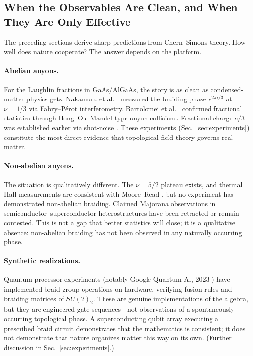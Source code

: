 \subsection{When the Observables Are Clean, and When They Are Only Effective}
\label{subsec:qhe-caveats}

The preceding sections derive sharp predictions from Chern--Simons theory. How well does nature cooperate? The answer depends on the platform.

\paragraph{Abelian anyons.}
For the Laughlin fractions in GaAs/AlGaAs, the story is as clean as condensed-matter physics gets. Nakamura et al.\ \cite{Nakamura2020AnyonicBraiding} measured the braiding phase $e^{2\pi i/3}$ at $\nu = 1/3$ via Fabry--P\'{e}rot interferometry. Bartolomei et al.\ \cite{Bartolomei2020AnyonCollisions} confirmed fractional statistics through Hong--Ou--Mandel-type anyon collisions. Fractional charge $e/3$ was established earlier via shot-noise \cite{Saminadayar1997FractionalCharge,dePicciotto1997FractionalCharge}. These experiments (Sec.~\ref{sec:experiments}) constitute the most direct evidence that topological field theory governs real matter.

\paragraph{Non-abelian anyons.}
The situation is qualitatively different. The $\nu = 5/2$ plateau exists, and thermal Hall measurements are consistent with Moore--Read \cite{NayakSimonSternFreedmanDasSarma2008NonabelianAnyons}, but no experiment has demonstrated non-abelian braiding. Claimed Majorana observations in semiconductor--superconductor heterostructures have been retracted or remain contested. This is not a gap that better statistics will close; it is a qualitative absence: non-abelian braiding has not been observed in any naturally occurring phase.

\paragraph{Synthetic realizations.}
Quantum processor experiments (notably Google Quantum AI, 2023 \cite{Andersen2023NonAbelianBraiding}) have implemented braid-group operations on hardware, verifying fusion rules and braiding matrices of $SU(2)_2$. These are genuine implementations of the algebra, but they are engineered gate sequences---not observations of a spontaneously occurring topological phase. A superconducting qubit array executing a prescribed braid circuit demonstrates that the mathematics is consistent; it does not demonstrate that nature organizes matter this way on its own. (Further discussion in Sec.~\ref{sec:experiments}.)

